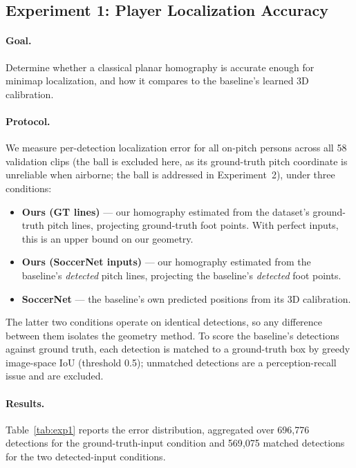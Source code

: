 \documentclass{article}
\begin{document}
\subsection{Experiment 1: Player Localization Accuracy}

\paragraph{Goal.}
Determine whether a classical planar homography is accurate enough for
minimap localization, and how it compares to the baseline's learned 3D
calibration.

\paragraph{Protocol.}
We measure per-detection localization error for all on-pitch persons across
all 58 validation clips (the ball is excluded here, as its ground-truth pitch
coordinate is unreliable when airborne; the ball is addressed in
Experiment~2), under three conditions:
\begin{itemize}
  \item \textbf{Ours (GT lines)} --- our homography estimated from the
    dataset's ground-truth pitch lines, projecting ground-truth foot points.
    With perfect inputs, this is an upper bound on our geometry.
  \item \textbf{Ours (SoccerNet inputs)} --- our homography estimated from the
    baseline's \emph{detected} pitch lines, projecting the baseline's
    \emph{detected} foot points.
  \item \textbf{SoccerNet} --- the baseline's own predicted positions from its
    3D calibration.
\end{itemize}
The latter two conditions operate on identical detections, so any difference
between them isolates the geometry method. To score the baseline's detections
against ground truth, each detection is matched to a ground-truth box by
greedy image-space IoU (threshold 0.5); unmatched detections are a
perception-recall issue and are excluded.

\paragraph{Results.}
Table~\ref{tab:exp1} reports the error distribution, aggregated over 696{,}776
detections for the ground-truth-input condition and 569{,}075 matched
detections for the two detected-input conditions.
\end{document}
